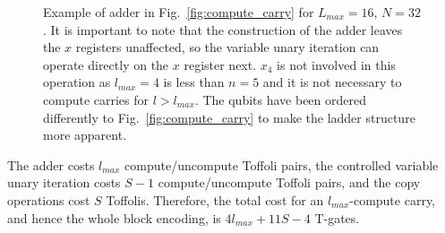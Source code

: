 \documentclass[aps,prx,twocolumn,floatfix,10pt,amssymb,amsfont,amsmath,superscriptaddress,float,nofootinbib,longbibliography,nobalancelastpage]{revtex4-2}
\theoremstyle{empty}
\begin{document}
\begin{figure}
\caption{\label{fig:adder}Example of adder in Fig.~\ref{fig:compute_carry} for $L_{max} = 16$, $N=32$. It is important to note that the construction of the adder leaves the $x$ registers unaffected, so the variable unary iteration can operate directly on the $x$ register next. $x_4$ is not involved in this operation as $l_{max}=4$ is less than $n=5$ and it is not necessary to compute carries for $l > l_{max}$. The qubits have been ordered differently to Fig.~\ref{fig:compute_carry} to make the ladder structure more apparent.}
\end{figure}

The adder costs $l_{max}$ compute/uncompute Toffoli pairs, the controlled variable unary iteration costs $S-1$ compute/uncompute Toffoli pairs, and the copy operations cost $S$ Toffolis.  Therefore, the total cost for an $l_{max}$-compute carry, and hence the whole block encoding, is $4l_{max} + 11S - 4$ T-gates.
\end{document}
